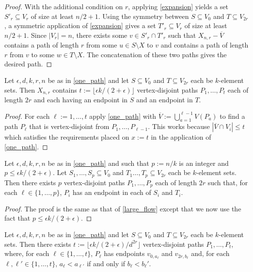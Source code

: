 \documentclass{patmorin}
\begin{document}
\begin{proof}
  With the additional condition on $r$,
  applying \cref{expansion} yields a set $S'_r\subseteq V_{r}$ of size at least $n/2+1$.  Using the symmetry between $S\subseteq V_0$ and $T\subseteq V_{2r}$, a symmetric application of \cref{expansion} gives a set $T'_r\subseteq V_{r}$ of size at least $n/2+1$.  Since $|V_r|=n$,  there exists some $v\in S'_r\cap T'_r$ such that $X_{n,r}-\overline{V}$ contains a path of length $r$ from some $u\in S\setminus X$ to $v$ and contains a path of length $r$ from $v$ to some $w\in T\setminus X$.  The concatenation of these two paths gives the desired path.
\end{proof}

\begin{lem}\label{large_flow}
  Let $\epsilon, d, k, r, n$ be as in \cref{one_path} and let $S\subseteq V_0$ and $T\subseteq V_{2r}$ each be $k$-element sets.  Then $X_{n,r}$ contains $t:= \lfloor \epsilon k / (2+\epsilon)\rfloor$ vertex-disjoint paths $P_1,\ldots,P_{t}$ each of length $2r$ and each having an endpoint in $S$ and an endpoint in $T$.
\end{lem}

\begin{proof}
  For each $\ell:=1,\ldots,t$ apply \cref{one_path} with $\overline{V}:=\bigcup_{a=1}^{\ell-1} V(P_a)$ to find a path $P_\ell$ that is vertex-disjoint from $P_{1},\ldots,P_{\ell-1}$.  This works because $|\overline{V}\cap V_i|\le t$ which satisfies the requirements placed on $x:=t$ in the application of \cref{one_path}.
\end{proof}

\begin{lem}\label{large_crossing_flow}
  Let $\epsilon, d, k, r, n$ be as in \cref{one_path} and such that $p:=n/k$ is an integer and $p\le \epsilon k/(2+\epsilon)$. Let $S_1,\ldots,S_p\subseteq V_0$ and $T_1\ldots,T_p\subseteq V_{2r}$ each be $k$-element sets.  Then there exists $p$ vertex-disjoint paths $P_1,\ldots,P_{p}$ each of length $2r$ such that, for each $\ell\in\{1,\ldots,p\}$, $P_i$ has an endpoint in each of $S_i$ and $T_i$.
\end{lem}

\begin{proof}
  The proof is the same as that of \cref{large_flow} except that we now use the fact that $p\le \epsilon k/(2+\epsilon)$.
\end{proof}


\begin{lem}\label{large_ordered_flow}
  Let $\epsilon, d, k, r, n$ be as in \cref{one_path} and let $S\subseteq V_0$ and $T\subseteq V_{2r}$ each be $k$-element sets.  Then there exists $t:= \lfloor \epsilon k / (2+\epsilon)/d^{2r}\rfloor$ vertex-disjoint paths $P_1,\ldots,P_{t}$, where, for each $\ell\in\{1,\ldots,t\}$, $P_\ell$ has endpoints $v_{0,a_\ell}$ and $v_{2r,b_\ell}$ and, for each $\ell,\ell'\in\{1,\ldots,t\}$, $a_\ell < a_{\ell'}$ if and only if $b_\ell < b_\ell'$.
\end{lem}
\end{document}

